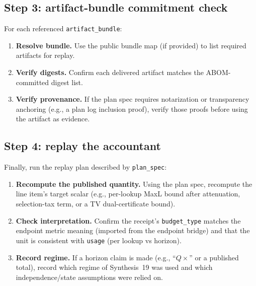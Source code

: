 \documentclass[11pt]{article}
\begin{document}
\subsection{Step 3: artifact-bundle commitment check}
For each referenced \texttt{artifact\_bundle}:
\begin{enumerate}[leftmargin=*]
\item \textbf{Resolve bundle.} Use the public bundle map (if provided) to list required artifacts for replay.
\item \textbf{Verify digests.} Confirm each delivered artifact matches the ABOM-committed digest list.
\item \textbf{Verify provenance.} If the plan spec requires notarization or transparency anchoring (e.g., a plan log inclusion proof), verify those proofs before using the artifact as evidence.\cite{series:transparencyprimitives}
\end{enumerate}

\subsection{Step 4: replay the accountant}
Finally, run the replay plan described by \texttt{plan\_spec}:
\begin{enumerate}[leftmargin=*]
\item \textbf{Recompute the published quantity.} Using the plan spec, recompute the line item's target scalar (e.g., per-lookup MaxL bound after attenuation, selection-tax term, or a TV dual-certificate bound).
\item \textbf{Check interpretation.} Confirm the receipt's \texttt{budget\_type} matches the endpoint metric meaning (imported from the endpoint bridge) and that the unit is consistent with \texttt{usage} (per lookup vs horizon).\cite{series:accountingrulebook}
\item \textbf{Record regime.} If a horizon claim is made (e.g., ``$Q\times$'' or a published total), record which regime of Synthesis~19 was used and which independence/state assumptions were relied on.\cite{series:accountingrulebook}
\end{enumerate}
\end{document}
